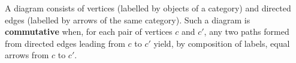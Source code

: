 A diagram consists of vertices (labelled by objects of a category) and directed edges (labelled by arrows of the same category). Such a diagram is \textbf{commutative} when, for each pair of vertices $c$ and $c'$, any two paths formed from directed edges leading from $c$ to $c'$ yield, by composition of labels, equal arrows from $c$ to $c'$.
